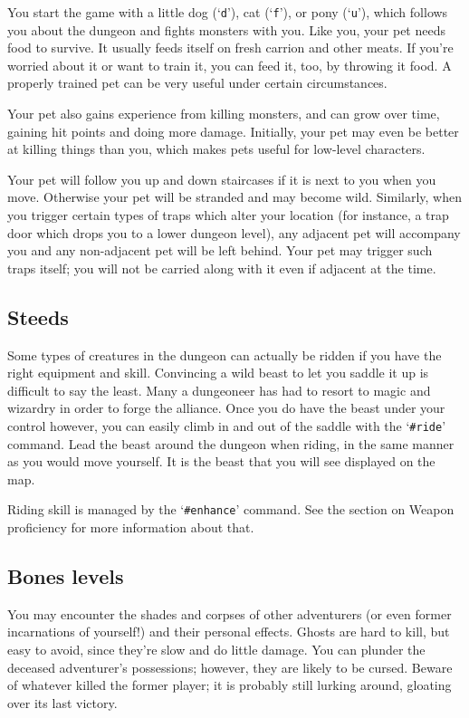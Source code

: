 You start the game with a little dog (`{\tt d}'), cat (`{\tt f}'),
or pony (`{\tt u}'), which follows
you about the dungeon and fights monsters with you.  Like you, your
pet needs food to survive.  It usually feeds itself on fresh carrion
and other meats.  If you're worried about it or want to train it, you
can feed it, too, by throwing it food.  A properly trained pet can be
very useful under certain circumstances.

Your pet also gains experience from killing monsters, and can grow
over time, gaining hit points and doing more damage.  Initially, your
pet may even be better at killing things than you, which makes pets
useful for low-level characters.

Your pet will follow you up and down staircases if it is next to you
when you move.  Otherwise your pet will be stranded and may become
wild.  Similarly, when you trigger certain types of traps which alter
your location (for instance, a trap door which drops you to a lower
dungeon level), any adjacent pet will accompany you and any non-adjacent
pet will be left behind.  Your pet may trigger such traps itself; you
will not be carried along with it even if adjacent at the time.

\subsection*{Steeds}

Some types of creatures in the dungeon can actually be ridden if you
have the right equipment and skill.  Convincing a wild beast to let
you saddle it up is difficult to say the least.  Many a dungeoneer
has had to resort to magic and wizardry in order to forge the alliance.
Once you do have the beast under your control however, you can
easily climb in and out of the saddle with the `{\tt \#ride}' command.  Lead
the beast around the dungeon when riding, in the same manner as
you would move yourself.  It is the beast that you will see displayed
on the map.

Riding skill is managed by the `{\tt \#enhance}' command.  See the section
on Weapon proficiency for more information about that.

\subsection*{Bones levels}

You may encounter the shades and corpses of other adventurers (or even
former incarnations of yourself!) and their personal effects.  Ghosts
are hard to kill, but easy to avoid, since they're slow and do little
damage.  You can plunder the deceased adventurer's possessions;
however, they are likely to be cursed.  Beware of whatever killed the
former player; it is probably still lurking around, gloating over its
last victory.

